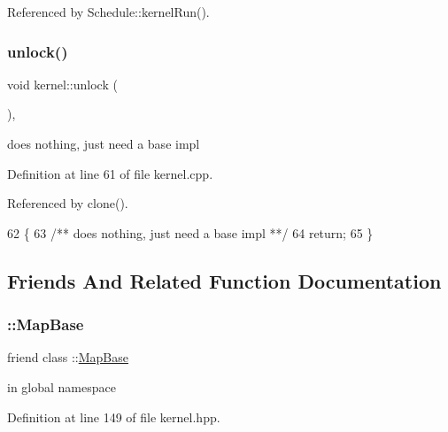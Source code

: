 


Referenced by Schedule\+::kernel\+Run().

\hypertarget{classraft_1_1kernel_a7966dcabb0ed65ac52f6f78918256861}{}\label{classraft_1_1kernel_a7966dcabb0ed65ac52f6f78918256861} 
\subsubsection{\texorpdfstring{unlock()}{unlock()}}
{\footnotesize\ttfamily void kernel\+::unlock (\begin{DoxyParamCaption}{ }\end{DoxyParamCaption})\hspace{0.3cm}{\ttfamily [protected]}, {\ttfamily [virtual]}}

does nothing, just need a base impl 

Definition at line 61 of file kernel.\+cpp.



Referenced by clone().


\begin{DoxyCode}
62 \{\textcolor{comment}{}
63 \textcolor{comment}{   /** does nothing, just need a base impl **/}
64    \textcolor{keywordflow}{return};
65 \}
\end{DoxyCode}


\subsection{Friends And Related Function Documentation}
\hypertarget{classraft_1_1kernel_a1045638a7591b3c72cd145fc541d6478}{}\label{classraft_1_1kernel_a1045638a7591b3c72cd145fc541d6478} 
\subsubsection{\texorpdfstring{\+::\+Map\+Base}{::MapBase}}
{\footnotesize\ttfamily friend class \+::\hyperlink{class_map_base}{Map\+Base}\hspace{0.3cm}{\ttfamily [friend]}}

in global namespace 

Definition at line 149 of file kernel.\+hpp.

\hypertarget{classraft_1_1kernel_aeda338414e516b47761f994fb78056c6}{}\label{classraft_1_1kernel_aeda338414e516b47761f994fb78056c6} 
